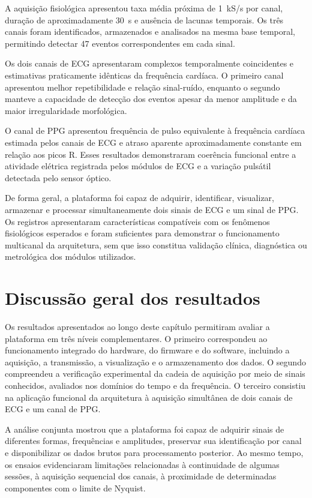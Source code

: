 \documentclass[a4paper,12pt]{fcte}
\begin{document}
A aquisição fisiológica apresentou taxa média próxima de 1~kS/s por canal, duração de aproximadamente 30~s e ausência de lacunas temporais. Os três canais foram identificados, armazenados e analisados na mesma base temporal, permitindo detectar 47 eventos correspondentes em cada sinal.

Os dois canais de ECG apresentaram complexos temporalmente coincidentes e estimativas praticamente idênticas da frequência cardíaca. O primeiro canal apresentou melhor repetibilidade e relação sinal-ruído, enquanto o segundo manteve a capacidade de detecção dos eventos apesar da menor amplitude e da maior irregularidade morfológica.

O canal de PPG apresentou frequência de pulso equivalente à frequência cardíaca estimada pelos canais de ECG e atraso aparente aproximadamente constante em relação aos picos R. Esses resultados demonstraram coerência funcional entre a atividade elétrica registrada pelos módulos de ECG e a variação pulsátil detectada pelo sensor óptico.

De forma geral, a plataforma foi capaz de adquirir, identificar, visualizar, armazenar e processar simultaneamente dois sinais de ECG e um sinal de PPG. Os registros apresentaram características compatíveis com os fenômenos fisiológicos esperados e foram suficientes para demonstrar o funcionamento multicanal da arquitetura, sem que isso constitua validação clínica, diagnóstica ou metrológica dos módulos utilizados.

\section{Discussão geral dos resultados}
\label{sec:discussao_geral}

Os resultados apresentados ao longo deste capítulo permitiram avaliar a plataforma em três níveis complementares. O primeiro correspondeu ao funcionamento integrado do hardware, do firmware e do software, incluindo a aquisição, a transmissão, a visualização e o armazenamento dos dados. O segundo compreendeu a verificação experimental da cadeia de aquisição por meio de sinais conhecidos, avaliados nos domínios do tempo e da frequência. O terceiro consistiu na aplicação funcional da arquitetura à aquisição simultânea de dois canais de ECG e um canal de PPG.

A análise conjunta mostrou que a plataforma foi capaz de adquirir sinais de diferentes formas, frequências e amplitudes, preservar sua identificação por canal e disponibilizar os dados brutos para processamento posterior. Ao mesmo tempo, os ensaios evidenciaram limitações relacionadas à continuidade de algumas sessões, à aquisição sequencial dos canais, à proximidade de determinadas componentes com o limite de Nyquist.
\end{document}

